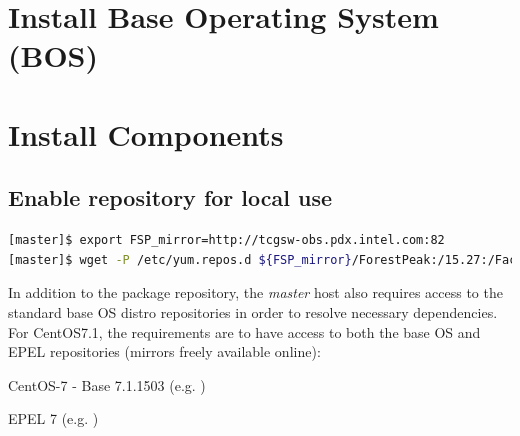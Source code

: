 \documentclass[letterpaper]{article}
\newcommand{\baseOS}{CentOS7.1}
\begin{document}






\section{Install Base Operating System (BOS)}



\section{Install \FSP{} Components} \label{sec:basic_install}


\subsection{Enable \FSP{} repository for local use} \label{sec:enable_repo}


\begin{lstlisting}[language=bash,keywords={}]
[master]$ export FSP_mirror=http://tcgsw-obs.pdx.intel.com:82
[master]$ wget -P /etc/yum.repos.d ${FSP_mirror}/ForestPeak:/15.27:/Factory/CentOS-7.1_Intel/ForestPeak:15.27:Factory.repo
\end{lstlisting}

In addition to the \FSP{} package repository, the {\em master} host also
requires access to the standard base OS distro repositories in order to resolve
necessary dependencies. For \baseOS{}, the requirements are to have access to
both the base OS and EPEL repositories (mirrors freely available online):

\begin{itemize*}
\item CentOS-7 - Base 7.1.1503
  (e.g. \href{http://mirror.centos.org/centos/7.1.1503/os/x86\_64}
             {\color{blue}{http://mirror.centos.org/centos/7.1.1503/os/x86\_64}} )
\item EPEL 7 (e.g. \href{http://download.fedoraproject.org/pub/epel/7/x86\_64}
                        {\color{blue}{http://download.fedoraproject.org/pub/epel/7/x86\_64}} )
\end{itemize*}
\end{document}
